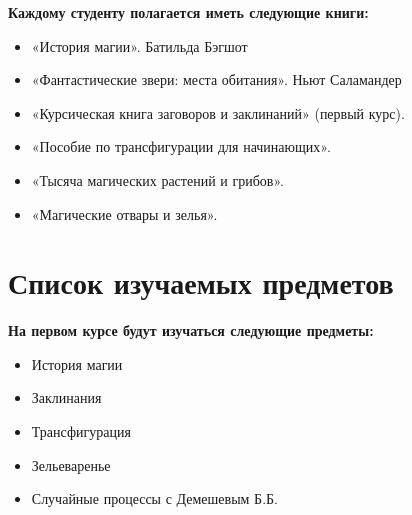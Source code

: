 \documentclass[12pt,a4paper, oneside]{report}
\renewcommand{\thesection}{Приложение \Asbuk{section}:}
\begin{document}
\textbf{Каждому студенту полагается иметь следующие книги:}
\begin{itemize}
	\item «История магии». Батильда Бэгшот
	\item «Фантастические звери: места обитания». Ньют Саламандер
	\item «Курсическая книга заговоров и заклинаний» (первый курс).
	\item «Пособие по трансфигурации для начинающих». 
	\item «Тысяча магических растений и грибов».
	\item «Магические отвары и зелья». 
\end{itemize}

\newpage

\section{Список изучаемых предметов}\label{\thesection}
\textbf{На первом курсе будут изучаться следующие предметы:}
\begin{itemize}
	\item История магии
	\item Заклинания
	\item Трансфигурация
	\item Зельеваренье
	\item Случайные процессы с Демешевым Б.Б. 
\end{itemize}
\end{document}
